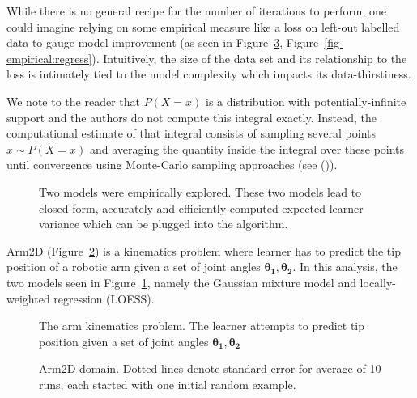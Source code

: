 \documentclass[
  letterpaper,
  numbers=noenddot,
  DIV=11]{scrreprt}
\theoremstyle{plain}
\theoremstyle{definition}
\theoremstyle{plain}
\theoremstyle{remark}
\begin{document}
While there is no general recipe for the number of iterations to
perform, one could imagine relying on some empirical measure like a loss
on left-out labelled data to gauge model improvement (as seen in
Figure~\ref{fig-empirical:gauss}, Figure~\ref{fig-empirical:regress}).
Intuitively, the size of the data set and its relationship to the loss
is intimately tied to the model complexity which impacts its
data-thirstiness.

We note to the reader that \(P(X=x)\) is a distribution with
potentially-infinite support and the authors do not compute this
integral exactly. Instead, the computational estimate of that integral
consists of sampling several points \(x \sim P(X=x)\) and averaging the
quantity inside the integral over these points until convergence using
Monte-Carlo sampling approaches (see ()).

\begin{figure}


\caption{\label{fig-two_models}Two models were empirically explored.
These two models lead to closed-form, accurately and
efficiently-computed expected learner variance which can be plugged into
the algorithm.}

\end{figure}%

Arm2D (Figure~\ref{fig-arm2D}) is a kinematics problem where learner has
to predict the tip position of a robotic arm given a set of joint angles
\(\mathbf{\theta_1}, \mathbf{\theta_2}\). In this analysis, the two
models seen in Figure~\ref{fig-two_models}, namely the Gaussian mixture
model and locally-weighted regression (LOESS).

\begin{figure}


\caption{\label{fig-arm2D}The arm kinematics problem. The learner
attempts to predict tip position given a set of joint angles
\(\mathbf{\theta_1}, \mathbf{\theta_2}\)}

\end{figure}%

\begin{figure}


\caption{\label{fig-empirical:gauss}Arm2D domain. Dotted lines denote
standard error for average of 10 runs, each started with one initial
random example.}

\end{figure}%
\end{document}
